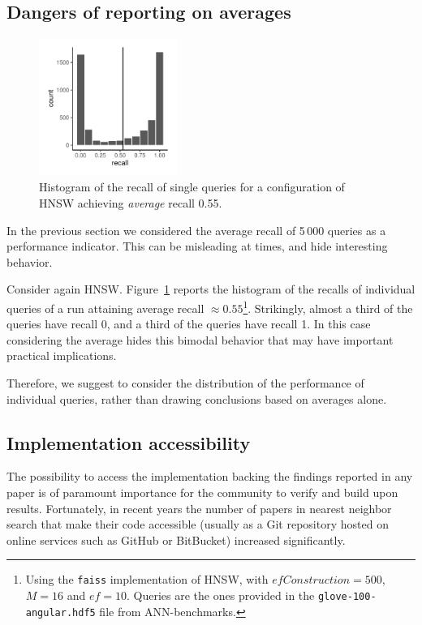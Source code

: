 \documentclass[11pt]{article}
\begin{document}
\subsection{Dangers of reporting on averages}
\begin{figure}
	\centering
	\includegraphics[width=0.4\textwidth]{submissions/Matteo2023/figures/hist_recall.pdf}
	\caption{Histogram of the recall of single queries for a configuration
		of HNSW achieving \emph{average} recall 0.55.\label{matteo_fig:hist-recall}}
\end{figure}

In the previous section we considered the average recall of 5\,000 queries
as a performance indicator.
This can be misleading at times, and hide interesting behavior.

Consider again HNSW. Figure~\ref{matteo_fig:hist-recall} reports the histogram of
the recalls of individual queries of a run attaining average recall
$\approx 0.55$\footnote{
	Using the \texttt{faiss} implementation of HNSW, with $efConstruction = 500$,
	$M = 16$ and $ef = 10$.
	Queries are the ones provided in the \texttt{glove-100-angular.hdf5} file from ANN-benchmarks.
}.
Strikingly, almost a third of the queries have recall 0, and a third
of the queries have recall 1. In this case considering the average hides
this bimodal behavior that may have important practical implications.

Therefore, we suggest to consider the distribution of the performance of
individual queries, rather than drawing conclusions based on averages alone.

\subsection{Implementation accessibility}

The possibility to access the implementation backing the findings reported in
any paper is of paramount importance for the community to verify and build upon
results.
Fortunately, in recent years the number of papers in nearest neighbor search that
make their code accessible (usually as a Git repository hosted on online services
such as GitHub or BitBucket) increased significantly.
\end{document}
